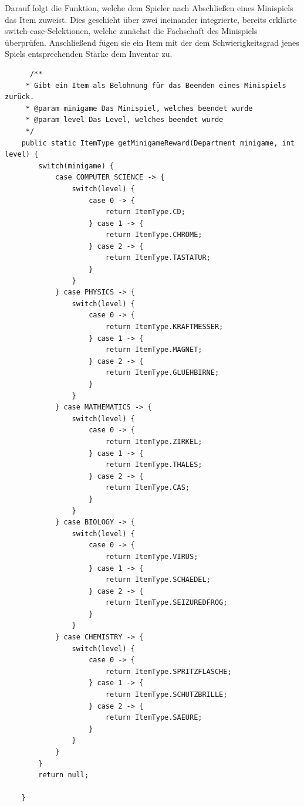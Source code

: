 Darauf folgt die Funktion, welche dem Spieler nach Abschließen eines Minispiels das Item zuweist.
Dies geschieht über zwei ineinander integrierte, bereits erklärte switch-case-Selektionen, welche zunächst die Fachschaft des Minispiels überprüfen. Anschließend fügen sie ein Item mit der dem Schwierigkeitsgrad jenes Spiels entsprechenden Stärke dem Inventar zu.
\\
\begin{lstlisting}
      /**
     * Gibt ein Item als Belohnung für das Beenden eines Minispiels zurück.
     * @param minigame Das Minispiel, welches beendet wurde
     * @param level Das Level, welches beendet wurde
     */
    public static ItemType getMinigameReward(Department minigame, int level) {
        switch(minigame) {
            case COMPUTER_SCIENCE -> {
                switch(level) {
                    case 0 -> {
                        return ItemType.CD;
                    } case 1 -> {
                        return ItemType.CHROME;
                    } case 2 -> {
                        return ItemType.TASTATUR;
                    }
                }
            } case PHYSICS -> {
                switch(level) {
                    case 0 -> {
                        return ItemType.KRAFTMESSER;
                    } case 1 -> {
                        return ItemType.MAGNET;
                    } case 2 -> {
                        return ItemType.GLUEHBIRNE;
                    }
                }
            } case MATHEMATICS -> {
                switch(level) {
                    case 0 -> {
                        return ItemType.ZIRKEL;
                    } case 1 -> {
                        return ItemType.THALES;
                    } case 2 -> {
                        return ItemType.CAS;
                    }
                }
            } case BIOLOGY -> {
                switch(level) {
                    case 0 -> {
                        return ItemType.VIRUS;
                    } case 1 -> {
                        return ItemType.SCHAEDEL;
                    } case 2 -> {
                        return ItemType.SEIZUREDFROG;
                    }
                }
            } case CHEMISTRY -> {
                switch(level) {
                    case 0 -> {
                        return ItemType.SPRITZFLASCHE;
                    } case 1 -> {
                        return ItemType.SCHUTZBRILLE;
                    } case 2 -> {
                        return ItemType.SAEURE;
                    }
                }
            }  
        }
        return null;
        
    }
\end{lstlisting}

